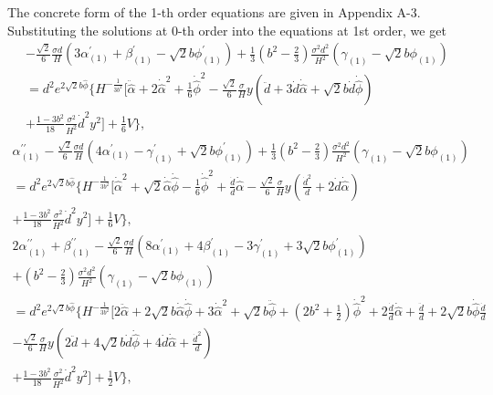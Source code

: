 \documentclass[a4paper,11pt]{article}
\begin{document}
The concrete form of the 1-th order equations are given in 
Appendix A-3. 
Substituting the solutions at 0-th order into the equations at 1st
order, we get 
\begin{multline}
-\frac{\sqrt{2}}{6}\frac{\sigma d}{H}
(3\alpha_{(1)}^{\prime}+\beta_{(1)}^{\prime}
-\sqrt{2}b\phi_{(1)}^{\prime})
+\frac{1}{3}\left(b^2-\frac{2}{3}\right)
\frac{\sigma^2 d^2}{H^2}(\gamma_{(1)}-\sqrt{2}b\phi_{(1)}) \\
=d^2 e^{2\sqrt{2}b\hat{\phi}}
\Bigg\{
H^{-\frac{1}{3b^2}}
\Bigg[
\ddot{\hat{\alpha}} +2 \dot{\hat{\alpha}}^2 
+ \frac{1}{6}\dot{\hat{\phi}}^2 
-\frac{\sqrt{2}}{6}\frac{\sigma}{H}y
(\ddot{d}+3\dot{d}\dot{\hat{\alpha}}+\sqrt{2}b\dot{d}\dot{\hat{\phi}}) \\
+\frac{1-3b^2}{18}\frac{\sigma^2}{H^2}\dot{d}^2 y^2
\Bigg]
+\frac{1}{6}V \Bigg\},
\label{eq:yy}
\end{multline}
\begin{multline}
\alpha_{(1)}^{\prime\prime}
-\frac{\sqrt{2}}{6}\frac{\sigma d}{H}
(4\alpha_{(1)}^{\prime}-\gamma_{(1)}^{\prime}+\sqrt{2}b\phi_{(1)}^{\prime})
+\frac{1}{3}\left(b^2-\frac{2}{3}\right)
\frac{\sigma^2 d^2}{H^2}(\gamma_{(1)}-\sqrt{2}b\phi_{(1)}) \\
=d^2 e^{2\sqrt{2}b\hat{\phi}}
\Bigg\{ 
H^{-\frac{1}{3b^2}}
\Bigg[
\dot{\hat{\alpha}}^2 + \sqrt{2}\dot{\hat{\alpha}}\dot{\hat{\phi}} 
- \frac{1}{6}\dot{\hat{\phi}}^2 +\frac{\dot{d}}{d}\dot{\hat{\alpha}}
-\frac{\sqrt{2}}{6}\frac{\sigma}{H}y
\left(\frac{\dot{d}^2}{d}+2\dot{d}\dot{\hat{\alpha}} \right) \\
+\frac{1-3b^2}{18}\frac{\sigma^2}{H^2}\dot{d}^2 y^2
\Bigg]
+\frac{1}{6}V
\Bigg\},
\end{multline}
\begin{multline}
2\alpha_{(1)}^{\prime\prime}+\beta_{(1)}^{\prime\prime} 
-\frac{\sqrt{2}}{6}\frac{\sigma d}{H}
(8\alpha_{(1)}^{\prime}+4\beta_{(1)}^{\prime}-3\gamma_{(1)}^{\prime}
+3\sqrt{2}b\phi_{(1)}^{\prime}) \\
+\left(b^2-\frac{2}{3}\right)\frac{\sigma^2 d^2}{H^2}
(\gamma_{(1)}-\sqrt{2}b\phi_{(1)}) \\
=d^2 e^{2\sqrt{2}b\hat{\phi}}
\Bigg\{
H^{-\frac{1}{3b^2}}
\Bigg[
2\ddot{\hat{\alpha}}+2\sqrt{2}b\dot{\hat{\alpha}}\dot{\hat{\phi}}
+3\dot{\hat{\alpha}}^2+\sqrt{2}b\ddot{\hat{\phi}}
+\left(2b^2 +\frac{1}{2}\right)\dot{\hat{\phi}}^2 +2\frac{\dot{d}}{d}\dot{\hat{\alpha}}
+\frac{\ddot{d}}{d}+2\sqrt{2}b\dot{\hat{\phi}}\frac{\dot{d}}{d} \\
-\frac{\sqrt{2}}{6}\frac{\sigma}{H}y
\left(
2\ddot{d}+4\sqrt{2}b\dot{d}\dot{\hat{\phi}}
+4\dot{d}\dot{\hat{\alpha}}
+\frac{\dot{d}^2}{d}
\right) \\
+\frac{1-3b^2}{18}\frac{\sigma^2}{H^2}\dot{d}^2 y^2
\Bigg]
+\frac{1}{2} V
\Bigg\},
\end{multline}
\end{document}
